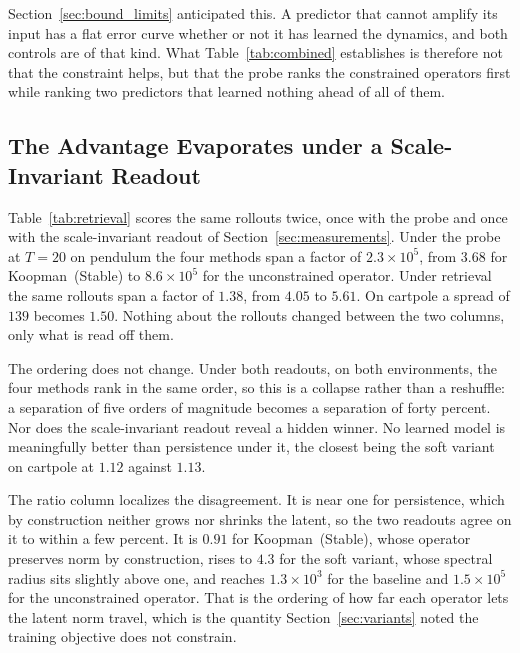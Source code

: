 \documentclass[10pt]{article} %
\begin{document}
Section~\ref{sec:bound_limits} anticipated this. A predictor that cannot amplify its input has a flat error curve whether or not it has learned the dynamics, and both controls are of that kind. What Table~\ref{tab:combined} establishes is therefore not that the constraint helps, but that the probe ranks the constrained operators first while ranking two predictors that learned nothing ahead of all of them.

\subsection{The Advantage Evaporates under a Scale-Invariant Readout}
\label{sec:inversion}

Table~\ref{tab:retrieval} scores the same rollouts twice, once with the probe and once with the scale-invariant readout of Section~\ref{sec:measurements}. Under the probe at $T{=}20$ on pendulum the four methods span a factor of $2.3\times10^{5}$, from $3.68$ for Koopman~(Stable) to $8.6\times10^{5}$ for the unconstrained operator. Under retrieval the same rollouts span a factor of $1.38$, from $4.05$ to $5.61$. On cartpole a spread of $139$ becomes $1.50$. Nothing about the rollouts changed between the two columns, only what is read off them.

The ordering does not change. Under both readouts, on both environments, the four methods rank in the same order, so this is a collapse rather than a reshuffle: a separation of five orders of magnitude becomes a separation of forty percent. Nor does the scale-invariant readout reveal a hidden winner. No learned model is meaningfully better than persistence under it, the closest being the soft variant on cartpole at $1.12$ against $1.13$.

The ratio column localizes the disagreement. It is near one for persistence, which by construction neither grows nor shrinks the latent, so the two readouts agree on it to within a few percent. It is $0.91$ for Koopman~(Stable), whose operator preserves norm by construction, rises to $4.3$ for the soft variant, whose spectral radius sits slightly above one, and reaches $1.3\times10^{3}$ for the baseline and $1.5\times10^{5}$ for the unconstrained operator. That is the ordering of how far each operator lets the latent norm travel, which is the quantity Section~\ref{sec:variants} noted the training objective does not constrain.
\end{document}
